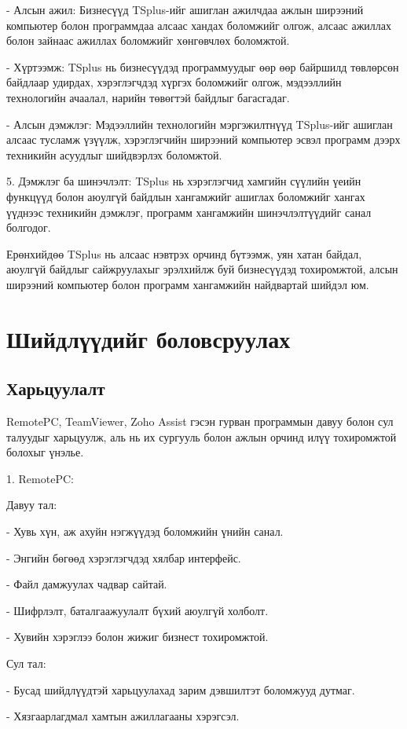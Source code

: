 - Алсын ажил: Бизнесүүд TSplus-ийг ашиглан ажилчдаа ажлын ширээний компьютер болон программдаа алсаас хандах боломжийг олгож, алсаас ажиллах болон зайнаас ажиллах боломжийг хөнгөвчлөх боломжтой.

- Хүртээмж: TSplus нь бизнесүүдэд программуудыг өөр өөр байршилд төвлөрсөн байдлаар удирдах, хэрэглэгчдэд хүргэх боломжийг олгож, мэдээллийн технологийн ачаалал, нарийн төвөгтэй байдлыг багасгадаг.

- Алсын дэмжлэг: Мэдээллийн технологийн мэргэжилтнүүд TSplus-ийг ашиглан алсаас тусламж үзүүлж, хэрэглэгчийн ширээний компьютер эсвэл программ дээрх техникийн асуудлыг шийдвэрлэх боломжтой.

5. Дэмжлэг ба шинэчлэлт: TSplus нь хэрэглэгчид хамгийн сүүлийн үеийн функцүүд болон аюулгүй байдлын хангамжийг ашиглах боломжийг хангах үүднээс техникийн дэмжлэг, программ хангамжийн шинэчлэлтүүдийг санал болгодог.

Ерөнхийдөө TSplus нь алсаас нэвтрэх орчинд бүтээмж, уян хатан байдал, аюулгүй байдлыг сайжруулахыг эрэлхийлж буй бизнесүүдэд тохиромжтой, алсын ширээний компьютер болон программ хангамжийн найдвартай шийдэл юм.
\pagebreak

\section{Шийдлүүдийг боловсруулах}
\subsection{Харьцуулалт}
	\quad \quad 
	RemotePC, TeamViewer, Zoho Assist гэсэн гурван программын давуу болон сул талуудыг харьцуулж, аль нь их сургууль болон ажлын орчинд илүү тохиромжтой болохыг үнэлье.

	1. RemotePC:
	
	Давуу тал:
	
	- Хувь хүн, аж ахуйн нэгжүүдэд боломжийн үнийн санал.
	
	- Энгийн бөгөөд хэрэглэгчдэд хялбар интерфейс.
	
	- Файл дамжуулах чадвар сайтай.
	
	- Шифрлэлт, баталгаажуулалт бүхий аюулгүй холболт.
	
	- Хувийн хэрэглээ болон жижиг бизнест тохиромжтой.
	
	Сул тал:
	
	- Бусад шийдлүүдтэй харьцуулахад зарим дэвшилтэт боломжууд дутмаг.
	
	- Хязгаарлагдмал хамтын ажиллагааны хэрэгсэл.
	
